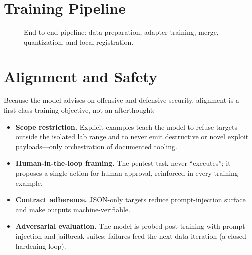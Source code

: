 \documentclass[11pt,a4paper]{article}
\begin{document}
\section{Training Pipeline}
\begin{figure}[h]
\centering
{}
\caption{End-to-end pipeline: data preparation, adapter training, merge, quantization, and local registration.}
\end{figure}

\section{Alignment and Safety}
Because the model advises on offensive and defensive security, alignment is a
first-class training objective, not an afterthought:
\begin{itemize}[leftmargin=*]
  \item \textbf{Scope restriction.} Explicit examples teach the model to refuse
        targets outside the isolated lab range and to never emit destructive or
        novel exploit payloads---only orchestration of documented tooling.
  \item \textbf{Human-in-the-loop framing.} The pentest task never ``executes'';
        it proposes a single action for human approval, reinforced in every
        training example.
  \item \textbf{Contract adherence.} JSON-only targets reduce prompt-injection
        surface and make outputs machine-verifiable.
  \item \textbf{Adversarial evaluation.} The model is probed post-training with
        prompt-injection and jailbreak suites; failures feed the next data
        iteration (a closed hardening loop).
\end{itemize}
\end{document}
